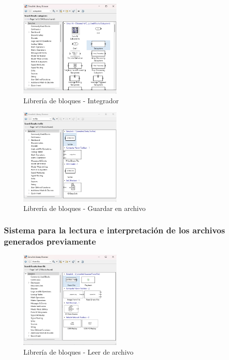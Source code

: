 \begin{figure}[h!]
    \centering
    \includegraphics[width=0.45\textwidth]{fig/Capitulo5/Caso_de_estudio_IMU/Generador_de_archivos/libreria_de_bloques_subsistema_integracion_velocidad_angular.png}
    \caption{Librería de bloques - Integrador}
    \label{fig:lib_bloques_integrador}
\end{figure}

\begin{figure}[h!]
    \centering
    \includegraphics[width=0.45\textwidth]{fig/Capitulo5/Caso_de_estudio_IMU/Generador_de_archivos/libreria_de_bloques_to_file.png}
    \caption{Librería de bloques - Guardar en archivo}
    \label{fig:lib_bloques_to_file_IMU}
\end{figure}

\subsubsection{Sistema para la lectura e interpretación de los archivos generados previamente}

\begin{figure}[h!]
    \centering
    \includegraphics[width=0.45\textwidth]{fig/Capitulo5/Caso_de_estudio_IMU/Generador_de_salidas/libreia_de_bloques_from_file.png}
    \caption{Librería de bloques - Leer de archivo}
    \label{fig:lib_bloques_from_file_IMU}
\end{figure}

